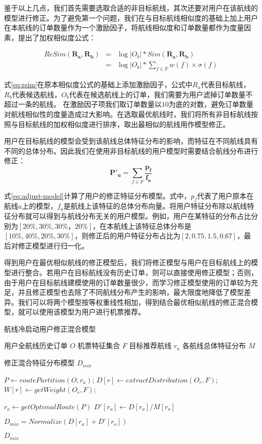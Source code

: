 鉴于以上几点，我们首先需要选取合适的非目标航线，其次还要对用户在该航线的模型进行修正。为了避免第一个问题，我们在与目标航线相似度的基础上加上用户在本航线的订单数量作为一个激励因子，将航线相似度和订单数量都作为度量因素，提出了加权相似度公式：

\begin{eqnarray}
\label{eq:rsim}
	ReSim(\mathbf{R_a,R_b}) & = & \log{|O_b|} * Sim(\mathbf{R_a,R_b})  \nonumber \\
                        & = & \log{|O_b|} * \sum_{f \in F}w(f) \times \sigma(f)
\end{eqnarray}

式\ref{eq:rsim}在原本相似度公式的基础上添加激励因子，公式中$R_a$代表目标航线，$R_b$代表候选航线，$O_b$代表在候选航线上的订单，我们需要为用户滤掉订单数量不超过一条的航线。
在激励因子项我们取订单数量以$10$为底的对数，避免订单数量对航线相似性的度量造成过大影响。在选取最优航线时，我们将所有非目标航线按照与目标航线的加权相似度进行排序，取出最相似的航线用作模型修正。

用户在目标航线的模型会受到该航线总体特征分布的影响，而特征在不同航线具有不同的总体分布。因此我们在使用非目标航线的用户模型时需要结合航线分布进行修正：
\begin{equation}
\label{eq:adjust-model}
	\mathbf{P'_u} = \sum_{f \in F} \frac{\mathbf{p_f}}{\mathbf{f_a}}
\end{equation}

式\ref{eq:adjust-model}计算了用户的修正特征分布模型。式中，$p_f$代表了用户原本在航线$a$上的模型，$f_a$是航线上该特征的总体分布向量。将用户特征分布除以航线特征分布就可以得到与航线分布无关的用户模型。例如，用户在某特征的分布占比分别为$[20\%,30\%,30\%，20\%]$，在本航线上该特征总体分布是$[10\%,40\%,20\%,30\%]$，则修正后的用户特征分布占比为$[2,0.75,1.5,0.67]$，最后对修正模型进行归一化。

得到用户在最优相似航线的修正模型后，我们将修正模型与用户在目标航线上的模型进行整合。若用户在目标航线没有历史订单，则可以直接使用修正模型；否则，由于用户在目标航线建模使用的订单数量很少，而学习修正模型使用的订单较为充足，并且修正模型也去除了不同航线分布产生的影响，最大限度地降低了模型差异。我们可以将两个模型按等权重线性相加，得到结合最优相似航线的修正混合模型，就可以使用该模型为用户进行机票推荐。

\begin{algorithm}
\caption{航线冷启动用户修正混合模型}
\label{algo:air_cold_dis}
\begin{algorithmic}[1]
\Require
\Statex 用户全航线历史订单 $O$
\Statex 机票特征集合 $F$
\Statex 目标推荐航线 $r_a$
\Statex 各航线总体特征分布 $M$

\Ensure 
\Statex 修正混合特征分布模型 $D_{mix}$

\State $P \gets routePartition(O,r_a)$;
\State $D[r] \gets extractDistribution(O_r,F)$;
\State $W[r] \gets getWeight(O_r,F)$;
\EndFor

\State $r_o \gets getOptimalRoute(P)$
\State $D'[r_o] \gets D[r_o] / M[r_o]$

\State $D_{mix} = Normalize(D[r_a] + D'[r_o])$

\State \Return $D_{mix}$
\end{algorithmic}
\end{algorithm}

